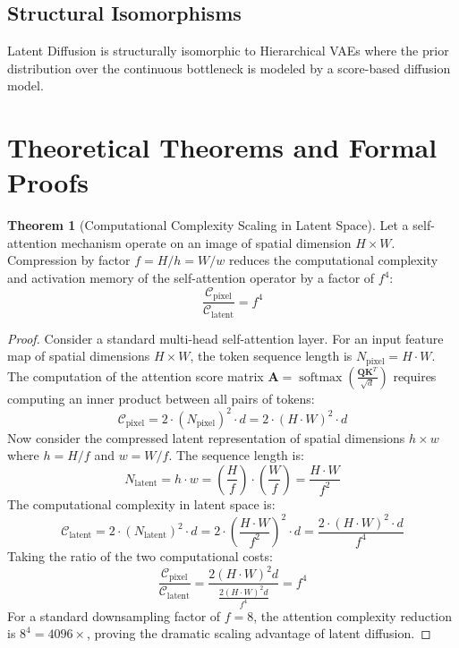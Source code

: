 \documentclass[11pt,a4paper]{article}
\theoremstyle{definition}
\newtheorem{theorem}{\textbf{Theorem}}[section]
\begin{document}
\subsection{Structural Isomorphisms}
Latent Diffusion is structurally isomorphic to Hierarchical VAEs where the prior distribution over the continuous bottleneck is modeled by a score-based diffusion model.

\section{Theoretical Theorems and Formal Proofs}

\begin{theorem}[Computational Complexity Scaling in Latent Space]
Let a self-attention mechanism operate on an image of spatial dimension $H \times W$. Compression by factor $f = H/h = W/w$ reduces the computational complexity and activation memory of the self-attention operator by a factor of $f^4$:
{\boldmath
\begin{equation}
\frac{\mathcal{C}_{\text{pixel}}}{\mathcal{C}_{\text{latent}}} = f^4
\end{equation}
}
\end{theorem}

\begin{proof}
Consider a standard multi-head self-attention layer. For an input feature map of spatial dimensions $H \times W$, the token sequence length is $N_{\text{pixel}} = H \cdot W$.
The computation of the attention score matrix $\mathbf{A} = \operatorname{softmax}\left(\frac{\mathbf{Q}\mathbf{K}^T}{\sqrt{d}}\right)$ requires computing an inner product between all pairs of tokens:
{\boldmath
\begin{equation}
\mathcal{C}_{\text{pixel}} = 2 \cdot (N_{\text{pixel}})^2 \cdot d = 2 \cdot (H \cdot W)^2 \cdot d
\end{equation}
}
Now consider the compressed latent representation of spatial dimensions $h \times w$ where $h = H/f$ and $w = W/f$. The sequence length is:
{\boldmath
\begin{equation}
N_{\text{latent}} = h \cdot w = \left(\frac{H}{f}\right) \cdot \left(\frac{W}{f}\right) = \frac{H \cdot W}{f^2}
\end{equation}
}
The computational complexity in latent space is:
{\boldmath
\begin{equation}
\mathcal{C}_{\text{latent}} = 2 \cdot (N_{\text{latent}})^2 \cdot d = 2 \cdot \left(\frac{H \cdot W}{f^2}\right)^2 \cdot d = \frac{2 \cdot (H \cdot W)^2 \cdot d}{f^4}
\end{equation}
}
Taking the ratio of the two computational costs:
{\boldmath
\begin{equation}
\frac{\mathcal{C}_{\text{pixel}}}{\mathcal{C}_{\text{latent}}} = \frac{2 (H \cdot W)^2 d}{\frac{2 (H \cdot W)^2 d}{f^4}} = f^4
\end{equation}
}
For a standard downsampling factor of $f = 8$, the attention complexity reduction is $8^4 = 4096\times$, proving the dramatic scaling advantage of latent diffusion.
\end{proof}
\end{document}
